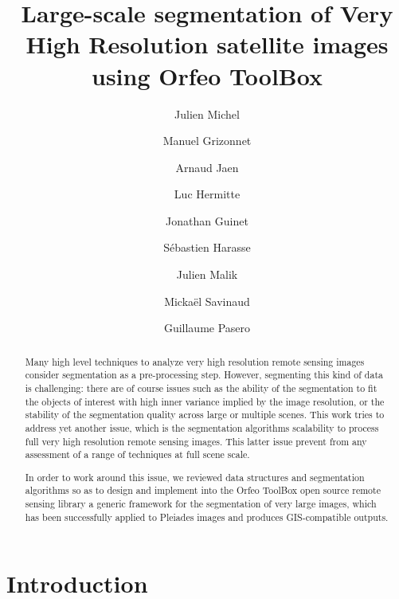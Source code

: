 \documentclass{josis}
\begin{document}
\title{Large-scale segmentation of Very High Resolution satellite images using Orfeo ToolBox}

\author{Julien Michel}
\author{Manuel Grizonnet}
\author{Arnaud Jaen}
\author{Luc Hermitte}
\author{Jonathan Guinet}
\author{S\'ebastien Harasse}
\author{Julien Malik}
\author{Micka\"el Savinaud}
\author{Guillaume Pasero}


\maketitle


\begin{abstract}
Many high level techniques to analyze very high resolution remote
sensing images consider segmentation as a pre-processing
step. However, segmenting this kind of data is challenging: there are
of course issues such as the ability of the segmentation to fit the
objects of interest with high inner variance implied by the image
resolution, or the stability of the segmentation quality across large
or multiple scenes. This work tries to address yet another issue,
which is the segmentation algorithms scalability to process full very
high resolution remote sensing images. This latter issue prevent from
any assessment of a range of techniques at full scene scale.

In order to work around this issue, we reviewed data structures and
segmentation algorithms so as to design and implement into the Orfeo
ToolBox open source remote sensing library a generic framework for
the segmentation of very large images, which has been successfully
applied to Pleiades images and produces GIS-compatible outputs.

\end{abstract}


\section{Introduction}
\end{document}
